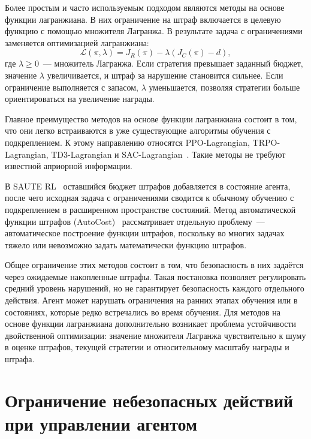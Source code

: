 Более простым и часто используемым подходом являются методы на основе функции лагранжиана. В них ограничение на штраф включается в целевую функцию с помощью множителя Лагранжа. В результате задача с ограничениями заменяется оптимизацией лагранжиана:
\begin{equation}
\mathcal{L}(\pi,\lambda)
=
J_R(\pi) - \lambda (J_C(\pi) - d),
\end{equation}
где $\lambda \geq 0$~--- множитель Лагранжа. Если стратегия превышает заданный бюджет, значение $\lambda$ увеличивается, и штраф за нарушение становится сильнее. Если ограничение выполняется с запасом, $\lambda$ уменьшается, позволяя стратегии больше ориентироваться на увеличение награды.

Главное преимущество методов на основе функции лагранжиана состоит в том, что они легко встраиваются в уже существующие алгоритмы обучения с подкреплением. К этому направлению относятся PPO-Lagrangian, TRPO-Lagrangian, TD3-Lagrangian и SAC-Lagrangian~\cite{ray2019benchmarking,stooke2020pidlag,yang2021wcsac}. Такие методы не требуют известной априорной информации.

В SAUTE RL~\cite{sootla2022saute} оставшийся бюджет штрафов добавляется в состояние агента, после чего исходная задача с ограничениями сводится к обычному обучению с подкреплением в расширенном пространстве состояний. Метод автоматической функции штрафов (AutoCost)~\cite{he2023autocost} рассматривает отдельную проблему~--- автоматическое построение функции штрафов, поскольку во многих задачах тяжело или невозможно задать математически функцию штрафов.

Общее ограничение этих методов состоит в том, что безопасность в них задаётся через ожидаемые накопленные штрафы. Такая постановка позволяет регулировать средний уровень нарушений, но не гарантирует безопасность каждого отдельного действия. Агент может нарушать ограничения на ранних этапах обучения или в состояниях, которые редко встречались во время обучения. Для методов на основе функции лагранжиана дополнительно возникает проблема устойчивости двойственной оптимизации: значение множителя Лагранжа чувствительно к шуму в оценке штрафов, текущей стратегии и относительному масштабу награды и штрафа.

\section{Ограничение небезопасных действий при управлении агентом}
\label{sec:safety_filters}

